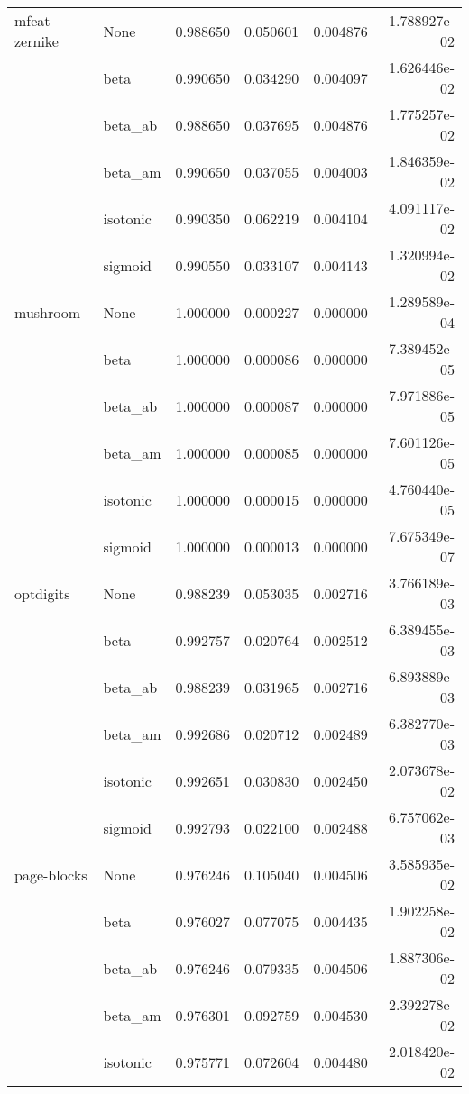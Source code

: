 \begin{tabular}{llrrrr}
mfeat-zernike & None &  0.988650 &  0.050601 &  0.004876 &  1.788927e-02 \\
        & beta &  0.990650 &  0.034290 &  0.004097 &  1.626446e-02 \\
        & beta\_ab &  0.988650 &  0.037695 &  0.004876 &  1.775257e-02 \\
        & beta\_am &  0.990650 &  0.037055 &  0.004003 &  1.846359e-02 \\
        & isotonic &  0.990350 &  0.062219 &  0.004104 &  4.091117e-02 \\
        & sigmoid &  0.990550 &  0.033107 &  0.004143 &  1.320994e-02 \\
mushroom & None &  1.000000 &  0.000227 &  0.000000 &  1.289589e-04 \\
        & beta &  1.000000 &  0.000086 &  0.000000 &  7.389452e-05 \\
        & beta\_ab &  1.000000 &  0.000087 &  0.000000 &  7.971886e-05 \\
        & beta\_am &  1.000000 &  0.000085 &  0.000000 &  7.601126e-05 \\
        & isotonic &  1.000000 &  0.000015 &  0.000000 &  4.760440e-05 \\
        & sigmoid &  1.000000 &  0.000013 &  0.000000 &  7.675349e-07 \\
optdigits & None &  0.988239 &  0.053035 &  0.002716 &  3.766189e-03 \\
        & beta &  0.992757 &  0.020764 &  0.002512 &  6.389455e-03 \\
        & beta\_ab &  0.988239 &  0.031965 &  0.002716 &  6.893889e-03 \\
        & beta\_am &  0.992686 &  0.020712 &  0.002489 &  6.382770e-03 \\
        & isotonic &  0.992651 &  0.030830 &  0.002450 &  2.073678e-02 \\
        & sigmoid &  0.992793 &  0.022100 &  0.002488 &  6.757062e-03 \\
page-blocks & None &  0.976246 &  0.105040 &  0.004506 &  3.585935e-02 \\
        & beta &  0.976027 &  0.077075 &  0.004435 &  1.902258e-02 \\
        & beta\_ab &  0.976246 &  0.079335 &  0.004506 &  1.887306e-02 \\
        & beta\_am &  0.976301 &  0.092759 &  0.004530 &  2.392278e-02 \\
        & isotonic &  0.975771 &  0.072604 &  0.004480 &  2.018420e-02 \\

\end{tabular}
